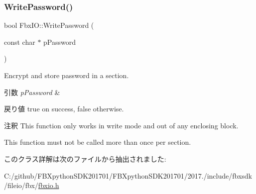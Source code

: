 \subsubsection{\texorpdfstring{Write\+Password()}{WritePassword()}}
{\footnotesize\ttfamily bool Fbx\+I\+O\+::\+Write\+Password (\begin{DoxyParamCaption}\item[{const char $\ast$}]{p\+Password }\end{DoxyParamCaption})}

Encrypt and store password in a section. 
\begin{DoxyParams}{引数}
{\em p\+Password} & \\
\hline
\end{DoxyParams}
\begin{DoxyReturn}{戻り値}
{\ttfamily true} on success, {\ttfamily false} otherwise. 
\end{DoxyReturn}
\begin{DoxyRemark}{注釈}
This function only works in write mode and out of any enclosing block. 

This function must not be called more than once per section. 
\end{DoxyRemark}


このクラス詳解は次のファイルから抽出されました\+:\begin{DoxyCompactItemize}
\item 
C\+:/github/\+F\+B\+Xpython\+S\+D\+K201701/\+F\+B\+Xpython\+S\+D\+K201701/2017./include/fbxsdk/fileio/fbx/\hyperlink{fbxio_8h}{fbxio.\+h}\end{DoxyCompactItemize}
